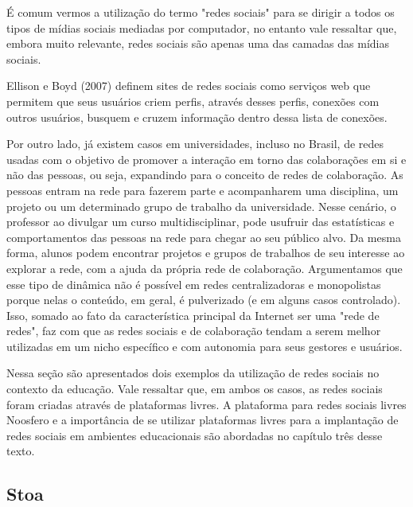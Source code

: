 É comum vermos a utilização do termo "redes sociais" para se dirigir a todos os
tipos de mídias sociais mediadas por computador, no entanto vale ressaltar que,
embora muito relevante, redes sociais são apenas uma das camadas das mídias sociais.

Ellison e Boyd (2007) \cite{beer2008} definem sites de redes sociais como
serviços web que permitem que seus usuários criem perfis, através desses perfis,
conexões com outros usuários, busquem e cruzem informação dentro dessa lista de
conexões.

Por outro lado, já existem casos em universidades, incluso no Brasil, de redes 
usadas com o objetivo de promover a interação em torno das colaborações em si e
não das pessoas, ou seja, expandindo para o conceito de redes de colaboração. As
pessoas entram na rede para fazerem parte e acompanharem uma disciplina, um projeto
ou um determinado grupo de trabalho da universidade. Nesse cenário, o professor
ao divulgar um curso multidisciplinar, pode usufruir das estatísticas e
comportamentos das pessoas na rede para chegar ao seu público alvo. Da mesma
forma, alunos podem encontrar projetos e grupos de trabalhos de seu interesse ao
explorar a rede, com a ajuda da própria rede de colaboração. Argumentamos que
esse tipo de dinâmica não é possível em redes centralizadoras e monopolistas
porque nelas o conteúdo, em geral, é pulverizado (e em alguns casos controlado).
Isso, somado ao fato da característica principal da Internet ser uma "rede de redes",
faz com que as redes sociais e de colaboração tendam a serem melhor utilizadas
em um nicho específico e com autonomia para seus gestores e usuários.

Nessa seção são apresentados dois exemplos da utilização de redes sociais no
contexto da educação. Vale ressaltar que, em ambos os casos, as redes sociais
foram criadas através de plataformas livres. A plataforma para redes sociais livres
Noosfero e a importância de se utilizar plataformas livres para a implantação de
redes sociais em ambientes educacionais são abordadas no capítulo três desse texto.

\subsection{Stoa}

